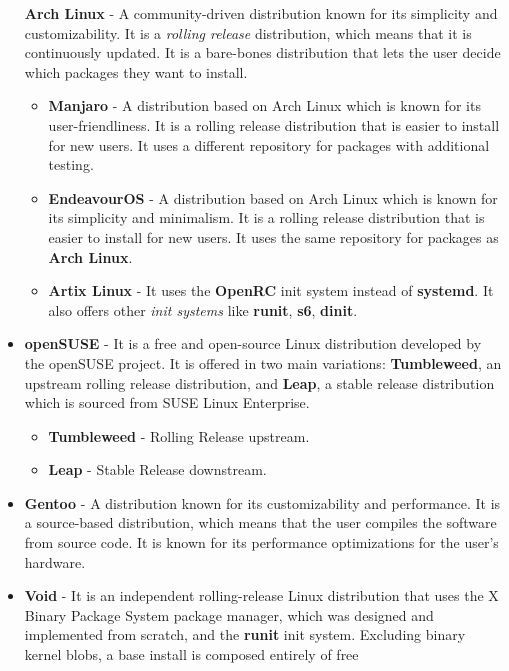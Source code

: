 \begin{itemize}
    \textbf{Arch Linux} - A community-driven distribution known for its simplicity and customizability. It is a \textit{rolling release} distribution, which means that it is continuously updated. It is a bare-bones distribution that lets the user decide which packages they want to install.
    \begin{itemize}
      \item \textbf{Manjaro} - A distribution based on Arch Linux which is known for its user-friendliness. It is a rolling release distribution that is easier to install for new users. It uses a different repository for packages with additional testing.
      \item \textbf{EndeavourOS} - A distribution based on Arch Linux which is known for its simplicity and minimalism. It is a rolling release distribution that is easier to install for new users. It uses the same repository for packages as \textbf{Arch Linux}.
      \item \textbf{Artix Linux} - It uses the \textbf{OpenRC} init system instead of \textbf{systemd}. It also offers other \textit{init systems} like \textbf{runit}, \textbf{s6}, \textbf{dinit}.
    \end{itemize}
  \item
    \textbf{openSUSE} - It is a free and open-source Linux distribution developed by the openSUSE project. It is offered in two main variations: \textbf{Tumbleweed}, an upstream rolling release distribution, and \textbf{Leap}, a stable release distribution which is sourced from SUSE Linux Enterprise.
    \begin{itemize}
      \item \textbf{Tumbleweed} - Rolling Release upstream.
      \item \textbf{Leap} - Stable Release downstream.
    \end{itemize}
  \item
    \textbf{Gentoo} - A distribution known for its customizability and performance. It is a source-based distribution, which means that the user compiles the software from source code. It is known for its performance optimizations for the user's hardware.
  \item
    \textbf{Void} - It is an independent rolling-release Linux distribution that uses the X Binary Package System package manager, which was designed and implemented from scratch, and the \textbf{runit} init system. Excluding binary kernel blobs, a base install is composed entirely of free\sidenote{
}
\end{itemize}

